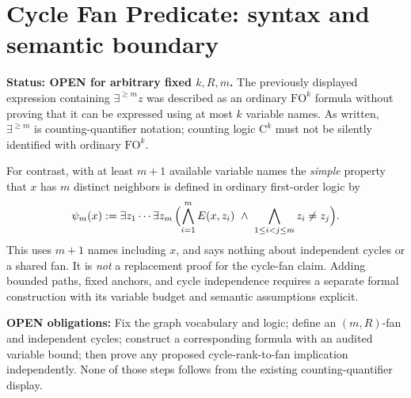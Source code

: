 \section*{Cycle Fan Predicate: syntax and semantic boundary}

\noindent\textbf{Status: OPEN for arbitrary fixed $k,R,m$.}
The previously displayed expression containing
$\exists^{\ge m}z$ was described as an ordinary $\mathrm{FO}^k$
formula without proving that it can be expressed using at most $k$
variable names. As written, $\exists^{\ge m}$ is counting-quantifier
notation; counting logic $\mathrm{C}^k$ must not be silently identified
with ordinary $\mathrm{FO}^k$.

For contrast, with at least $m+1$ available variable names the
\emph{simple} property that $x$ has $m$ distinct neighbors is defined in
ordinary first-order logic by
\[
\psi_m(x):=\exists z_1\cdots\exists z_m\,
\Bigl(\bigwedge_{i=1}^{m}E(x,z_i)\ \land\
\bigwedge_{1\le i<j\le m}z_i\ne z_j\Bigr).
\]
This uses $m+1$ names including $x$, and says nothing about independent
cycles or a shared fan. It is \emph{not} a replacement proof for the
cycle-fan claim. Adding bounded paths, fixed anchors, and cycle
independence requires a separate formal construction with its variable
budget and semantic assumptions explicit.

\noindent\textbf{OPEN obligations:} Fix the graph vocabulary and logic;
define an $(m,R)$-fan and independent cycles; construct a corresponding
formula with an audited variable bound; then prove any proposed
cycle-rank-to-fan implication independently. None of those steps follows
from the existing counting-quantifier display.
